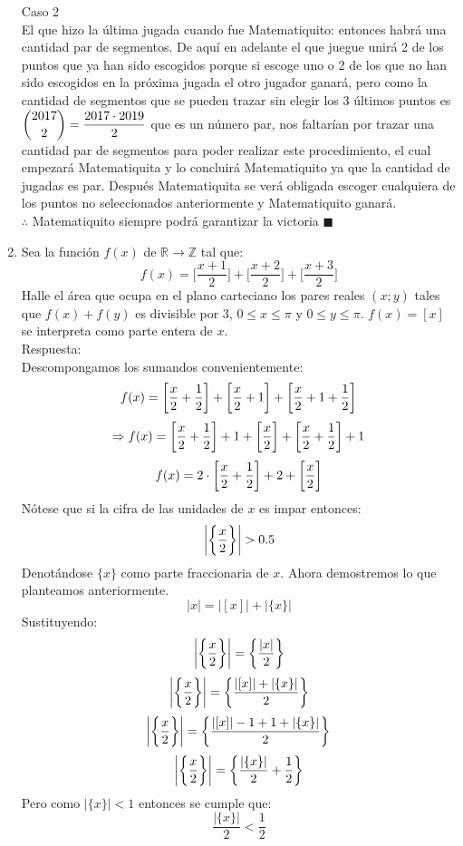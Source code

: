 \documentclass{book}
\newcommand{\R}{\mathbb{R}} \newcommand{\N}{\mathbb{N}}
\newcommand{\Z}{\mathbb{Z}} \def\max{\mathop{\mbox{\rm máx}}} %
\begin{document}
\begin{enumerate}
        Caso 2\\
        El que hizo la última jugada cuando fue Matematiquito: entonces habrá una cantidad par de segmentos. De aquí en adelante el que juegue unirá 2 de los puntos que ya han sido escogidos porque si escoge uno o 2 de los que no han sido escogidos en la próxima jugada el otro jugador ganará, pero como la cantidad de segmentos que se pueden trazar sin elegir los 3 últimos puntos es $\displaystyle{{2017 \choose 2}={2017\cdot 2019\over 2}}$ que es un número par, nos faltarían por trazar una cantidad par de segmentos para poder realizar este procedimiento, el cual empezará Matematiquita y lo concluirá Matematiquito ya que la cantidad de jugadas es par. Después Matematiquita se verá obligada escoger cualquiera de los puntos no seleccionados anteriormente y Matematiquito ganará.\\
        $\therefore$ Matematiquito siempre podrá garantizar la victoria $\blacksquare$\\
        \item  Sea la función $f(x)$ de $\R\rightarrow\Z$ tal que:
        $$f(x)=\bigg[\frac{x+1}{2}\bigg]+\bigg[\frac{x+2}{2}\bigg]+\bigg[\frac{x+3}{2}\bigg]$$
        Halle el área que ocupa en el plano carteciano los pares reales $(x;y)$ tales que $f(x)+f(y)$ es divisible por 3, $0\leq x\leq\pi$ y $0\leq y\leq \pi$.
        $f(x)=[x]$ se interpreta como parte entera de $x$.\\
        Respuesta:\\
        Descompongamos los sumandos convenientemente:
        $$f(x)=\bigg[{x\over 2}+{1\over 2}\bigg]+\bigg[{x\over 2}+1\bigg]+\bigg[{x\over 2}+1+{1\over 2}\bigg]$$
        $$\Rightarrow f(x)=\bigg[{x\over 2}+{1\over 2}\bigg]+1+\bigg[{x\over 2}\bigg]+\bigg[{x\over 2}+{1\over 2}\bigg]+1$$
        $$f(x)=2\cdot\bigg[{x\over 2}+{1\over 2}\bigg]+2+\bigg[{x\over 2}\bigg]$$
        Nótese que si la cifra de las unidades de $x$ es impar entonces:
        $$\bigg|\bigg\{{x\over 2}\bigg\}\bigg|>0.5$$
        Denotándose $\{x\}$ como parte fraccionaria de $x$. Ahora demostremos lo que planteamos anteriormente.
        $$|x|=|[x]|+|\{x\}|$$
        Sustituyendo:
        $$\bigg|\bigg\{{x\over 2}\bigg\}\bigg|=\bigg\{{|x|\over 2}\bigg\}$$
        $$\bigg|\bigg\{{x\over 2}\bigg\}\bigg|=\bigg\{\frac{|[x]|+|\{x\}|}{2}\bigg\}$$
        $$\bigg|\bigg\{{x\over 2}\bigg\}\bigg|=\bigg\{\frac{|[x]|-1+1+|\{x\}|}{2}\bigg\}$$
        $$\bigg|\bigg\{{x\over 2}\bigg\}\bigg|=\bigg\{\frac{|\{x\}|}{2}+{1\over 2}\bigg\}$$
        Pero como $|\{x\}|<1$ entonces se cumple que:
        $$\frac{|\{x\}|}{2}<\frac{1}{2}$$

\end{enumerate}
\end{document}
